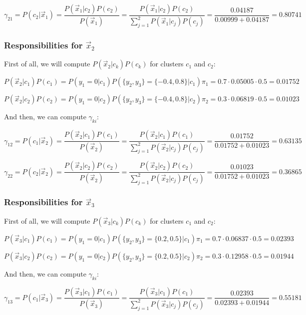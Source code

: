 \documentclass{article}
\begin{document}
\[ \gamma_{21} = P(c_2| \vec{x}_1) = \frac{P(\vec{x}_1 | c_2) P(c_2)}{P(\vec{x}_1)} = \frac{P(\vec{x}_1 | c_2) P(c_2)}{\sum_{j=1}^2 P(\vec{x}_1 | c_j) P(c_j)} = \frac{0.04187}{0.00999 + 0.04187} = 0.80741 \]

\subsubsection*{Responsibilities for $\vec{x}_2$}

First of all, we will compute $P(\vec{x}_2 | c_k) P(c_k)$ for clusters $c_1$ and $c_2$:

\[ P(\vec{x}_2 | c_1) P(c_1) = P(y_1 = 0 | c_1) P(\{y_2, y_3\}  = \{-0.4, 0.8\} | c_1) \pi_1 = 0.7 \cdot 0.05005 \cdot 0.5 = 0.01752 \]

\[ P(\vec{x}_2 | c_2) P(c_2) = P(y_1 = 0 | c_2) P(\{y_2, y_3\}  = \{-0.4, 0.8\} | c_2) \pi_2 = 0.3 \cdot 0.06819 \cdot 0.5 = 0.01023 \]

And then, we can compute $\gamma_{ki}$:

\[ \gamma_{12} = P(c_1| \vec{x}_2) = \frac{P(\vec{x}_2 | c_1) P(c_1)}{P(\vec{x}_2)} = \frac{P(\vec{x}_2 | c_1) P(c_1)}{\sum_{j=1}^2 P(\vec{x}_2 | c_j) P(c_j)} = \frac{0.01752}{0.01752 + 0.01023} = 0.63135 \]

\[ \gamma_{22} = P(c_2| \vec{x}_2) = \frac{P(\vec{x}_2 | c_2) P(c_2)}{P(\vec{x}_2)} = \frac{P(\vec{x}_2 | c_2) P(c_2)}{\sum_{j=1}^2 P(\vec{x}_2 | c_j) P(c_j)} = \frac{0.01023}{0.01752 + 0.01023} = 0.36865 \]

\subsubsection*{Responsibilities for $\vec{x}_3$}

First of all, we will compute $P(\vec{x}_3 | c_k) P(c_k)$ for clusters $c_1$ and $c_2$:

\[ P(\vec{x}_3 | c_1) P(c_1) = P(y_1 = 0 | c_1) P(\{y_2, y_3\}  = \{0.2, 0.5\} | c_1) \pi_1 = 0.7 \cdot 0.06837 \cdot 0.5 = 0.02393 \]

\[ P(\vec{x}_3 | c_2) P(c_2) = P(y_1 = 0 | c_2) P(\{y_2, y_3\}  = \{0.2, 0.5\} | c_2) \pi_2 = 0.3 \cdot 0.12958 \cdot 0.5 = 0.01944 \]

And then, we can compute $\gamma_{ki}$:

\[ \gamma_{13} = P(c_1| \vec{x}_3) = \frac{P(\vec{x}_3 | c_1) P(c_1)}{P(\vec{x}_3)} = \frac{P(\vec{x}_3 | c_1) P(c_1)}{\sum_{j=1}^2 P(\vec{x}_3 | c_j) P(c_j)} = \frac{0.02393}{0.02393 + 0.01944} = 0.55181 \]
\end{document}
